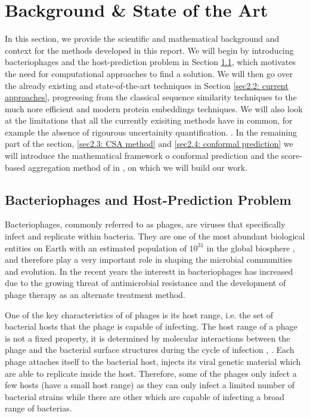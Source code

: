 \section{Background \& State of the Art}
\label{sec2: background}
\noindent In this section, we provide the scientific and mathematical background and context for the methods developed in this report. 
We will begin by introducing bacteriophages and the host-prediction problem in Section \ref{sec2.1: host prediction problem}, 
which motivates the need for computational approaches to find a solution. We will then go over the already existing and 
state-of-the-art techniques in Section \ref{sec2.2: current approaches}, progressing from the classical sequence similarity 
techniques to the much nore efficient and modern protein embeddings techniques. We will also look at the limitations that all the 
currently exisiting methods have in common, for example the absence of rigourous uncertainity quantification. .  In the remaining part of the section, \ref{sec2.3: CSA method} and 
\ref{sec2.4: conformal prediction} we will introduce the mathematical framework o conformal prediction and the score-based 
aggregation method of in \cite{ochoarivera2024conformal}, on which we will build our work.

\subsection{Bacteriophages and Host-Prediction Problem}
\label{sec2.1: host prediction problem}
\noindent Bacteriophages, commonly referred to as phages, are viruses that specifically infect and replicate within bacteria. They are one of 
the most abundant biological entities on Earth with an estimated population of $10^{31}$ in the global biosphere \cite{dejonge2019molecular}, 
and therefore play a very important role in shaping the microbial communities and evolution. In the recent years the interestt in 
bacteriophages has increased due to the growing threat of antimicrobial resistance and the development of phage therapy as an 
alternate treatment method. 

\vspace{0.15cm} 
\noindent One of the key characteristics of of phages is its host range, i.e. the set of bacterial hosts that the phage is capable of 
infecting. The host range of a phage is not a fixed property, it is determined by molecular interactions between the phage and 
the bacterial surface structures during the cycle of infection \cite{dejonge2019molecular}, \cite{holtappels2023drivers}. Each phage attaches 
itself to the bacterial host, injects its viral genetic material which are able to replicate inside the host. Therefore, some of 
the phages only infect a few hosts (have a small host range) as they can only infect a limited number of bacterial strains while 
there are other which are capable of infecting a broad range of bacterias. 

